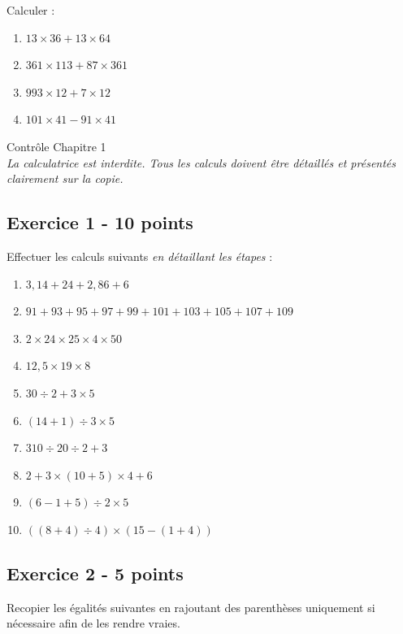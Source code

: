 \documentclass[14 pt]{extarticle}
\theoremstyle{plain}
\begin{document}
 Calculer : 
 \begin{enumerate}
 \item $13 \times 36 + 13\times 64 $
 \item $ 361 \times 113 +  87 \times 361 $
 \item $ 993 \times 12 + 7 \times 12$
 \item $ 101 \times 41 - 91 \times 41$
 \end{enumerate}
 \newpage
 	 

\begin{center}{\Large Contrôle Chapitre 1}\\ 

\emph{La calculatrice est interdite. Tous les calculs doivent être détaillés et présentés clairement sur la copie. }
 \end{center}
 
  

\subsection*{Exercice 1 - 10 points} 
 
Effectuer les calculs suivants \emph{en détaillant les étapes} : 
 
 \begin{enumerate}
 \item $ 3,14 + 24 + 2,86 + 6 $
 \item $ 91 + 93 + 95 + 97 + 99 + 101 + 103 + 105 + 107 +109$
 \item $2 \times 24 \times 25 \times 4\times 50$
 \item $ 12,5 \times 19 \times 8 $
 \item $ 30 \div 2 + 3 \times 5$
 \item $ (14 +1)\div 3 \times 5$
 \item $310 \div 20 \div 2 + 3 $
 \item $ 2 + 3 \times (10 + 5) \times 4 + 6$
 \item $ (6 - 1 + 5)\div 2 \times 5$
 \item $ ( ( 8 + 4 ) \div 4 ) \times ( 15 - ( 1 + 4 ) )$
 \end{enumerate}
 
 \subsection*{Exercice 2 - 5 points}
 
 Recopier les égalités suivantes en rajoutant des parenthèses uniquement si nécessaire afin de les rendre vraies. 
 
\end{document}
